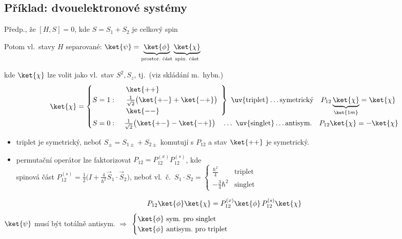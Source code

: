 \subsection*{Příklad: dvouelektronové systémy}
Předp., že $[H,S] = 0$, kde $S = S_1 + S_2$ je celkový spin

Potom vl.\ stavy $H$ separované: \quad
$\ket{\psi} = \underbrace{\ket{\phi}}_{\text{prostor.\ část}}\underbrace{\ket{\chi}}_{\text{spin.\ část}}$

kde $\ket{\chi}$ lze volit jako vl.\ stav $S^2, S_z$, tj.\ (viz skládání m.\ hybn.)
\[
  \ket{\chi} = \begin{cases}
    S = 1: & \left.\begin{array}{l}
               \ket{++} \\
               \frac{1}{\sqrt2}\big(\ket{+-} + \ket{-+}\big) \\
               \ket{--}
             \end{array}\right\}
             \ \text{\uv{triplet}}\dots\text{symetrický}\quad P_{12}\underbrace{\ket{\chi}}_{\ket{1m}} = \ket{\chi} \\[18pt]
    S = 0: & \ \frac{1}{\sqrt2}\big(\ket{+-} - \ket{-+}\big)
             \quad\dots\ \text{\uv{singlet}}\dots\text{antisym.}\quad P_{12}\ket{\chi} = -\ket{\chi}
  \end{cases}
\]

\begin{itemize}
  \item triplet je symetrický, neboť $S_\pm = S_{1\pm} + S_{2\pm}$ komutují s $P_{12}$ a stav $\ket{++}$ je symetrický.
  \item permutační operátor lze faktorizovat \quad $P_{12} = P_{12}^{(x)}P_{12}^{(s)}$, kde \\
        spinová část \quad $P_{12}^{(s)} = \frac12\Big(I + \frac{4}{\hbar^2}\vec S_1\cdot\vec S_2\Big)$, \quad
        neboť vl.\ č.\ $S_1\cdot S_2 = \begin{cases} \frac{\hbar^2}{4} & \text{triplet} \\ -\frac34\hbar^2 & \text{singlet}\end{cases}$
\end{itemize}
\[
  P_{12}\ket{\phi}\ket{\chi} = P_{12}^{(x)}\ket{\phi}\,P_{12}^{(s)}\ket{\chi}
\]
$\ket{\psi}$ musí být totálně antisym. \quad $\Rightarrow$ \quad
$\begin{cases} \ket{\phi}\ \text{sym.\ pro singlet} \\ \ket{\phi}\ \text{antisym.\ pro triplet}\end{cases}$

